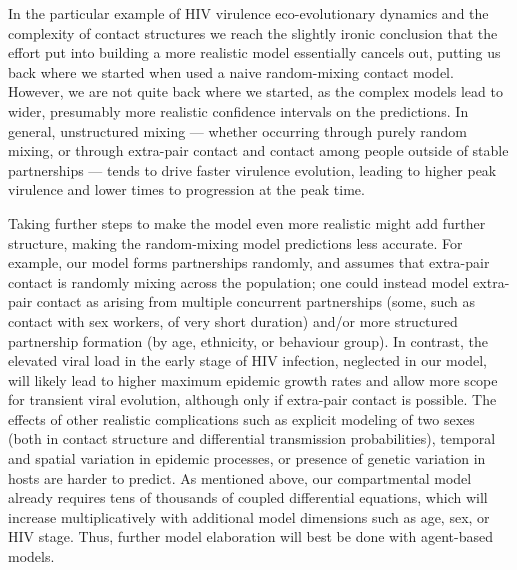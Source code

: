 \documentclass[10pt,letterpaper]{article}
\begin{document}
In the particular example of HIV virulence eco-evolutionary dynamics
and the complexity of contact structures
we reach the slightly ironic conclusion that the
effort put into building a more realistic model essentially cancels
out, putting us back where we started when used a naive random-mixing
contact model.
However, we are not quite back where we started, as the
complex models lead to wider, presumably more realistic
confidence intervals on the predictions.
In general, unstructured mixing --- whether occurring through 
purely random mixing, or through extra-pair contact and contact
among people outside of stable partnerships --- tends to drive
faster virulence evolution, leading to higher peak virulence and 
lower times to progression at the peak time.

Taking further steps to make the model even more realistic might add
further structure, making the random-mixing model predictions less
accurate. For example, our model forms partnerships randomly, and
assumes that extra-pair contact is randomly mixing across the
population; one could instead model extra-pair contact as arising from
multiple concurrent partnerships (some, such as contact with sex
workers, of very short duration) and/or more structured partnership
formation (by age, ethnicity, or behaviour group).
In contrast, the elevated viral load in the early stage of HIV infection,
neglected in our model, will likely lead to higher maximum
epidemic growth rates and allow more scope for transient viral
evolution, although only if extra-pair contact is possible.
The effects of
other realistic complications such as explicit modeling of two sexes
(both in contact structure and differential transmission
probabilities), temporal and spatial variation in epidemic processes,
or presence of genetic variation in hosts are harder to predict.
As mentioned above, our compartmental model already requires tens
of thousands of coupled differential equations, which will increase
multiplicatively with additional model dimensions such as age,
sex, or HIV stage. Thus, further model elaboration will best be 
done with agent-based models.
\end{document}

